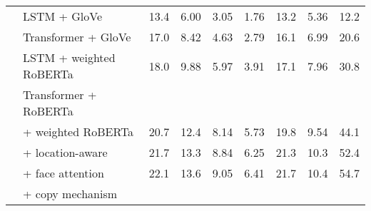 \begin{table*}[t]
\begin{tabularx}{\textwidth}{llXXXXXXX}
      & LSTM + GloVe & 13.4 & 6.00 & 3.05 & 1.76 & 13.2 & 5.36 & 12.2 \\ %
      & Transformer + GloVe & 17.0 & 8.42 & 4.63 & 2.79 & 16.1 & 6.99 & 20.6 \\ %
      & LSTM + weighted RoBERTa & 18.0 & 9.88 & 5.97 & 3.91 & 17.1 & 7.96 & 30.8 \\ %
      \cmidrule{2-9}
      & Transformer + RoBERTa \\
      & \quad + weighted RoBERTa & 20.7 & 12.4 & 8.14 & 5.73 & 19.8 & 9.54 & 44.1 \\ %
      & \quad\quad + location-aware & 21.7 & 13.3 & 8.84 & 6.25 & 21.3 & 10.3 & 52.4 \\ %
      & \quad\quad\quad + face attention & 22.1 & 13.6 & 9.05 & 6.41 & 21.7 & 10.4 & 54.7 \\ %
      & \quad\quad\quad\quad + copy mechanism \\
      \bottomrule
	\end{tabularx}
\end{table*}



